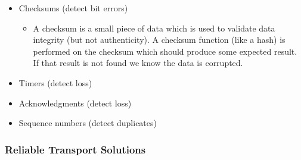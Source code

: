\documentclass[]{article}
\providecommand{\tightlist}{%
  \setlength{\itemsep}{0pt}\setlength{\parskip}{0pt}}
\begin{document}
\begin{itemize}
  \begin{itemize}
  \tightlist
  \item
    Checksums (detect bit errors)

    \begin{itemize}
    \tightlist
    \item
      A checksum is a small piece of data which is used to validate data
      integrity (but not authenticity). A checksum function (like a
      hash) is performed on the checksum which should produce some
      expected result. If that result is not found we know the data is
      corrupted.
    \end{itemize}
  \item
    Timers (detect loss)
  \item
    Acknowledgments (detect loss)
  \item
    Sequence numbers (detect duplicates)
  \end{itemize}
\end{itemize}

\hypertarget{reliable-transport-solutions}{%
\subsubsection{Reliable Transport
Solutions}\label{reliable-transport-solutions}}
\end{document}
